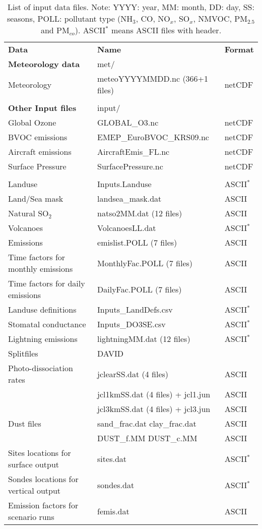 \begin{table}
\caption[List of input data files]{List of input data files.
Note: YYYY: year, MM: month, DD: day, SS: seasons, POLL: pollutant
type (NH$_3$, CO, NO$_x$, SO$_x$, NMVOC,
PM$_{2.5}$ and PM$_{co}$). ASCII$^*$ means ASCII files with header.
\label{Tab:inputdata}}
\begin{center}
\begin{small}
\hspace{-1cm}
\begin{tabular}{lll}
 && \\
\hline
{\bf Data} &  {\bf Name} & {\bf Format}\\
{\bf Meteorology data} & met/&  \\
Meteorology  &  meteoYYYYMMDD.nc \quad (366+1 files) & netCDF\\
& & \\
{\bf Other Input files} & input/ &\\
Global Ozone & GLOBAL\_O3.nc & netCDF\\
BVOC emissions & EMEP\_EuroBVOC\_KRS09.nc & netCDF\\
Aircraft emissions & AircraftEmis\_FL.nc & netCDF \\
Surface Pressure & SurfacePressure.nc & netCDF \\
& & \\
Landuse & Inputs.Landuse & ASCII$^*$\\
Land/Sea mask & landsea\_mask.dat & ASCII\\
Natural SO$_2$ & natso2MM.dat  \quad (12 files) & ASCII\\
Volcanoes & VolcanoesLL.dat & ASCII$^*$\\
Emissions & emislist.POLL  \quad (7 files) & ASCII\\
Time factors for monthly emissions& MonthlyFac.POLL  \quad (7 files) & ASCII\\
Time factors for daily emissions &  DailyFac.POLL  \quad (7 files) & ASCII\\
Landuse definitions & Inputs\_LandDefs.csv & ASCII$^*$\\
Stomatal conductance & Inputs\_DO3SE.csv & ASCII$^*$\\
Lightning emissions & lightningMM.dat  \quad (12 files) & ASCII$^*$\\
Splitfiles & DAVID&\\
Photo-dissociation rates & jclearSS.dat \quad (4 files) & ASCII\\
 & jcl1kmSS.dat \quad (4 files) + jcl1.jun & ASCII\\
 & jcl3kmSS.dat \quad (4 files) + jcl3.jun & ASCII\\
Dust files & sand\_frac.dat clay\_frac.dat & ASCII\\
 & DUST\_f.MM DUST\_c.MM & ASCII\\
Sites locations for surface output & sites.dat & ASCII$^*$\\
Sondes locations for vertical output & sondes.dat & ASCII$^*$\\
Emission factors for scenario runs & femis.dat & ASCII\\
\hline
\end{tabular}
\end{small}
\end{center}


\end{table}
